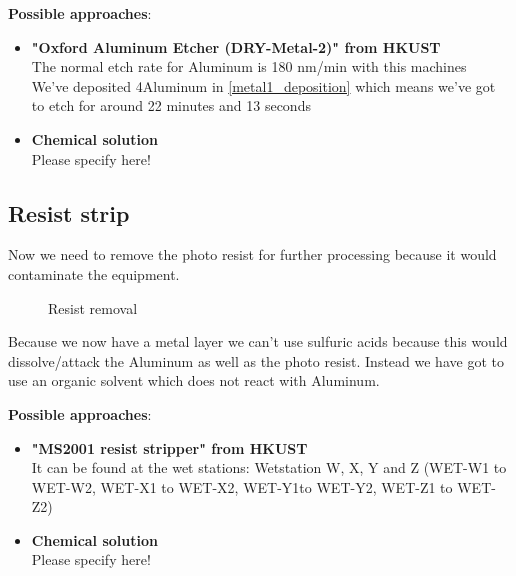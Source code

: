 \textbf{Possible approaches}:
\begin{itemize}
	\item \textbf{"Oxford Aluminum Etcher (DRY-Metal-2)" from HKUST} \\
	The normal etch rate for Aluminum is 180 nm/min with this machines \\
	We've deposited 4\um Aluminum in \autoref{metal1_deposition} which means we've got to etch for around 22 minutes and 13 seconds
	\item \textbf{Chemical solution} \\
	Please specify here!
\end{itemize}

\newpage

\subsection{Resist strip}

Now we need to remove the photo resist for further processing because it would contaminate the equipment.

\begin{figure}[H]
	\centering
	\begin{tikzpicture}[node distance = 3cm, auto, thick,scale=\CrossSectionOnly, every node/.style={transform shape}]
		
	\end{tikzpicture}
	\drawStepArrow{}
	\begin{tikzpicture}[node distance = 3cm, auto, thick,scale=\CrossSectionOnly, every node/.style={transform shape}]
		
	\end{tikzpicture}
	\caption{Resist removal}
\end{figure}

Because we now have a metal layer we can't use sulfuric acids because this would dissolve/attack the Aluminum as well as the photo resist.
Instead we have got to use an organic solvent which does not react with Aluminum.

\textbf{Possible approaches}:
\begin{itemize}
	\item \textbf{"MS2001 resist stripper" from HKUST} \\
	It can be found at the wet stations: Wetstation W, X, Y and Z (WET-W1 to WET-W2, WET-X1 to WET-X2, WET-Y1to WET-Y2, WET-Z1 to WET-Z2)
	\item \textbf{Chemical solution} \\
	Please specify here!
\end{itemize}
